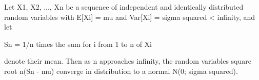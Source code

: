 \documentclass{article}
\begin{document}

Let X1, X2, ..., Xn be a sequence of independent and
identically distributed random variables with
E[Xi] = mu and Var[Xi] = sigma squared < infinity, 
and let

Sn = 1/n times the sum for i from 1 to n of Xi

denote their mean. Then as n approaches infinity, the
random variables square root n(Sn - mu) converge in
distribution to a normal N(0; sigma squared).
\end{document}
